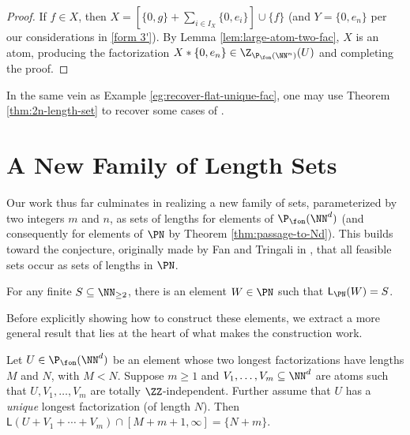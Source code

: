 \begin{proof}
	If $f\in X$, then $X = \left[\{0,g\}+\sum_{i\in I_X} \{0,e_i\} \right]\cup\{f\}$ (and $Y = \{0,e_n\}$ per our considerations in \ref{form 3'}).
	By Lemma \ref{lem:large-atom-two-fac}, $X$ is an atom, producing the factorization $X*\{0,e_n\}\in \Z_{\P_\fon(\NN^n)}(U)$ and completing the proof.
\end{proof}


\begin{rk}
	In the same vein as Example \ref{eg:recover-flat-unique-fac}, one may use Theorem \ref{thm:2n-length-set} to recover some cases of \cite[Proposition 4.8]{fan-tringali18}.
\end{rk}


\section{A New Family of Length Sets} \label{sec:new length sets}
Our work thus far culminates in realizing a new family of sets, parameterized by two integers $m$ and $n$, as sets of lengths for elements of $\P_\fon(\NN^d)$ (and consequently for elements of $\PN$ by Theorem \ref{thm:passage-to-Nd}).
This builds toward the conjecture, originally made by Fan and Tringali in \cite{fan-tringali18}, that all feasible sets occur as sets of lengths in $\PN$.
\begin{conj}
For any finite $S \subseteq \NN_{\ge 2}$, there is an element $W\in\PN$ such that $\mathsf{L}_\PN(W)=S$.
\end{conj}
Before explicitly showing how to construct these elements, we extract a more general result that lies at the heart of what makes the construction work. 

\begin{lemma} \label{lem:unique longest factorization}
Let $U\in \P_\fon(\NN^d)$ be an element whose two longest factorizations have lengths $M$ and $N$, with $M < N$.
Suppose $m\ge1$ and $V_1,\dots,V_m\subseteq \NN^d$ are atoms such that $U,V_1,\dots, V_m$ are totally $\ZZ$-independent.
Further assume that $U$ has a \textit{unique} longest factorization (of length $N$).
Then $\mathsf{L}(U+V_1+\cdots+V_m) \cap [ M+m+1,\infty ] = \{N+m\}$.
\end{lemma}

